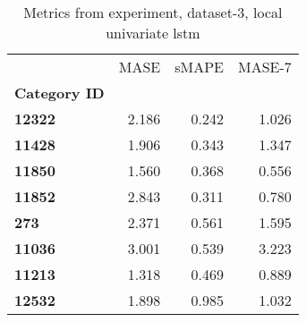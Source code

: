 \begin{table}[h]
\centering
\caption{Metrics from experiment, dataset-3, local univariate lstm}
\label{table:local-univariate-lstm-dataset-3}
\begin{tabular}{lrrr}
\toprule
{} &   MASE &  sMAPE &  MASE-7 \\
\textbf{Category ID} &        &        &         \\
\midrule
\textbf{12322      } &  2.186 &  0.242 &   1.026 \\
\textbf{11428      } &  1.906 &  0.343 &   1.347 \\
\textbf{11850      } &  1.560 &  0.368 &   0.556 \\
\textbf{11852      } &  2.843 &  0.311 &   0.780 \\
\textbf{273        } &  2.371 &  0.561 &   1.595 \\
\textbf{11036      } &  3.001 &  0.539 &   3.223 \\
\textbf{11213      } &  1.318 &  0.469 &   0.889 \\
\textbf{12532      } &  1.898 &  0.985 &   1.032 \\
\bottomrule
\end{tabular}
\end{table}

